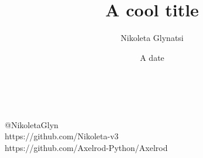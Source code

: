 \documentclass{beamer}
\title{A cool title}
\author{Nikoleta Glynatsi}
\date{A date}
\institute[]
{
\begin{center}
    \texttt{[image: static/cardiff\_uni\_logo.jpg]}
\end{center}
}
\begin{document}
\frame{\titlepage}


\begin{frame}
	\begin{center}
		\huge{\textbf{}}\\~\\
		\small{@NikoletaGlyn}\\
		\small{https://github.com/Nikoleta-v3}\\
		\small{https://github.com/Axelrod-Python/Axelrod}
	\end{center}
\end{frame}
\end{document}
